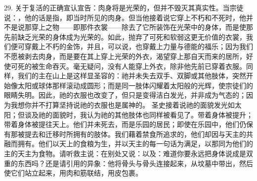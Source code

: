 29. 关于复活的正确宣认宣告：肉身将是光荣的，但并不毁灭其真实性。当宗徒说：，他的话是指，即当时所见的肉身。但当他接着说它穿上不朽和不死时，他并不是说那穿上之物——即那件衣裳——除去了它所装饰在光荣中的身体，而是使那先前缺乏光荣的身体成为光荣的。如此，抛弃了可死和软弱这更无价值的衣裳，我们便可穿戴上不朽的金饰，并且，可以说，也穿戴上力量与德能的福乐；因为我们不愿被剥去肉身，而是要在其上穿上光荣的外衣，渴望穿上那自天而来的居所，好使可死的被生命吞灭。毫无疑问，没有人能穿上外衣，除非他先前已穿着衣服。同样，我们的主在山上是这样显圣容的：祂并未失去双手、双脚或其他肢体，突然开始像太阳或球体那样滚动成圆形；而是同一肢体闪耀着太阳般的光辉，使宗徒们的眼睛失明。因此，祂的衣服也改变了，但只是变得洁白发光，并非成为气态的；因为我想你并不打算坚持说祂的衣服也是属神的。 圣史接着说祂的面貌发光如太阳；但谈及祂的面貌时，我认为祂的其他肢体也同样被看见了。带着身体被提升；带着身体被提往天上。他们并未死去，而是乐园的居民；即使在乐园中，他们仍保有那被提去和迁移时所拥有的肢体。我们藉着禁食所追求的，他们却因与天主的共融而拥有。他们以天上的食粮为生，并以天主的每一句话为满足，以那同为他们的主的天主为食物。请听救主说：在别处又说：以及：难道你要永远把身体说成是双重的东西吗？还是请引用的异象：他将骨头与骨头连接起来，从坟墓中带出，然后使它们站立起来，用肉和筋联结，用皮包裹。\par


